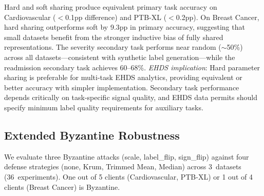 \documentclass[conference,a4paper]{IEEEtran}
\begin{document}
\begin{table}[htbp]
\centering
\caption{Multi-Task FL: Primary and Secondary Task Accuracy (\%)}
\label{tab:multitask_fl}

\vspace{1mm}
\footnotesize{Hard and soft sharing produce equivalent primary task accuracy on Cardiovascular ($<$0.1pp difference) and PTB-XL ($<$0.2pp). On Breast Cancer, hard sharing outperforms soft by 9.3pp in primary accuracy, suggesting that small datasets benefit from the stronger inductive bias of fully shared representations. The severity secondary task performs near random ($\sim$50\%) across all datasets---consistent with synthetic label generation---while the readmission secondary task achieves 60--68\%. \textit{EHDS implication}: Hard parameter sharing is preferable for multi-task EHDS analytics, providing equivalent or better accuracy with simpler implementation. Secondary task performance depends critically on task-specific signal quality, and EHDS data permits should specify minimum label quality requirements for auxiliary tasks.}
\end{table}

\subsection{Extended Byzantine Robustness}
\label{sec:byzantine_extended}

We evaluate three Byzantine attacks (scale, label\_flip, sign\_flip) against four defense strategies (none, Krum, Trimmed Mean, Median) across 3~datasets (36~experiments). One out of 5 clients (Cardiovascular, PTB-XL) or 1 out of 4 clients (Breast Cancer) is Byzantine.
\end{document}
